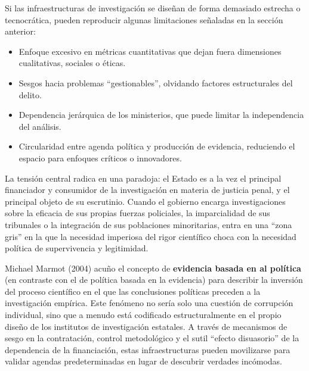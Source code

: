 \documentclass[
  spanish,
  letterpaper,
  DIV=11,
  numbers=noendperiod]{scrreprt}
\begin{document}
Si las infraestructuras de investigación se diseñan de forma demasiado
estrecha o tecnocrática, pueden reproducir algunas limitaciones
señaladas en la sección anterior:

\begin{itemize}
\item
  Enfoque excesivo en métricas cuantitativas que dejan fuera dimensiones
  cualitativas, sociales o éticas.
\item
  Sesgos hacia problemas ``gestionables'', olvidando factores
  estructurales del delito.
\item
  Dependencia jerárquica de los ministerios, que puede limitar la
  independencia del análisis.
\item
  Circularidad entre agenda política y producción de evidencia,
  reduciendo el espacio para enfoques críticos o innovadores.
\end{itemize}

La tensión central radica en una paradoja: el Estado es a la vez el
principal financiador y consumidor de la investigación en materia de
justicia penal, y el principal objeto de su escrutinio. Cuando el
gobierno encarga investigaciones sobre la eficacia de sus propias
fuerzas policiales, la imparcialidad de sus tribunales o la integración
de sus poblaciones minoritarias, entra en una ``zona gris'' en la que la
necesidad imperiosa del rigor científico choca con la necesidad política
de supervivencia y legitimidad.

Michael Marmot (2004) acuño el concepto de \textbf{evidencia basada en
al política} (en contraste con el de política basada en la evidencia)
para describir la inversión del proceso científico en el que las
conclusiones políticas preceden a la investigación empírica. Este
fenómeno no sería solo una cuestión de corrupción individual, sino que a
menudo está codificado estructuralmente en el propio diseño de los
institutos de investigación estatales. A través de mecanismos de sesgo
en la contratación, control metodológico y el sutil ``efecto
disuasorio'' de la dependencia de la financiación, estas
infraestructuras pueden movilizarse para validar agendas predeterminadas
en lugar de descubrir verdades incómodas.
\end{document}
